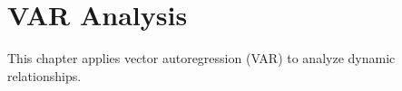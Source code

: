 
\chapter{VAR Analysis}

This chapter applies vector autoregression (VAR) to analyze dynamic relationships.

